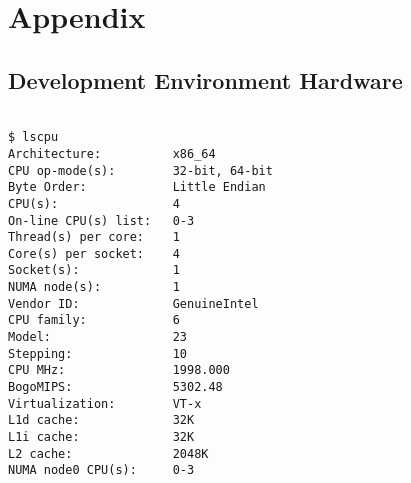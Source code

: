 \section{Appendix} 
\subsection{Development Environment Hardware}\label{sec:developmentenvironmenthardware}
\begin{small}
\begin{verbatim}

$ lscpu
Architecture:          x86_64
CPU op-mode(s):        32-bit, 64-bit
Byte Order:            Little Endian
CPU(s):                4
On-line CPU(s) list:   0-3
Thread(s) per core:    1
Core(s) per socket:    4
Socket(s):             1
NUMA node(s):          1
Vendor ID:             GenuineIntel
CPU family:            6
Model:                 23
Stepping:              10
CPU MHz:               1998.000
BogoMIPS:              5302.48
Virtualization:        VT-x
L1d cache:             32K
L1i cache:             32K
L2 cache:              2048K
NUMA node0 CPU(s):     0-3


\end{verbatim}
\end{small}
